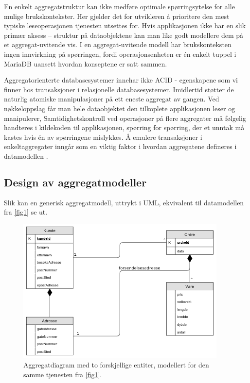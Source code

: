 En enkelt aggregatstruktur kan ikke medføre optimale spørringsytelse for alle mulige brukskontekster. Her gjelder det for utvikleren å prioritere den mest typiske leseoperasjonen tjenesten utsettes for. Hvis applikasjonen ikke har en slik primær aksess – struktur på dataobjektene kan man like godt modellere dem på et aggregat-uvitende vis. I en aggregat-uvitende modell har brukskonteksten ingen innvirkning på spørringen, fordi operasjonsenheten er én enkelt tuppel i MariaDB uansett hvordan konseptene er satt sammen.

Aggregatorienterte databasesystemer innehar ikke ACID - egenskapene som vi finner hos transaksjoner i relasjonelle databasesystemer. Imidlertid støtter de naturlig atomiske manipulasjoner på ett eneste aggregat av gangen. Ved nøkkeloppslag får man hele dataobjektet den tilkoplete applikasjonen leser og manipulerer, Samtidighetskontroll ved operasjoner på flere aggregater må følgelig handteres i kildekoden til applikasjonen, spørring for spørring, der et unntak må kastes hvis én av spørringene mislykkes. Å emulere transaksjoner i enkeltaggregater inngår som en viktig faktor i hvordan aggregatene defineres i datamodellen \citep{sadalage2013}.

\subsection{Design av aggregatmodeller}

Slik kan en generisk aggregatmodell, uttrykt i UML, ekvivalent til datamodellen fra \ref{fig1} se ut.

\begin{figure}[ht]
    \centering
    \includegraphics{fig/NettbutikkAggregatModell.png}
    \caption{Aggregatdiagram med to forskjellige entiter, modellert for den samme tjenesten fra \ref{fig1}.}
    \label{fig2}
\end{figure}

